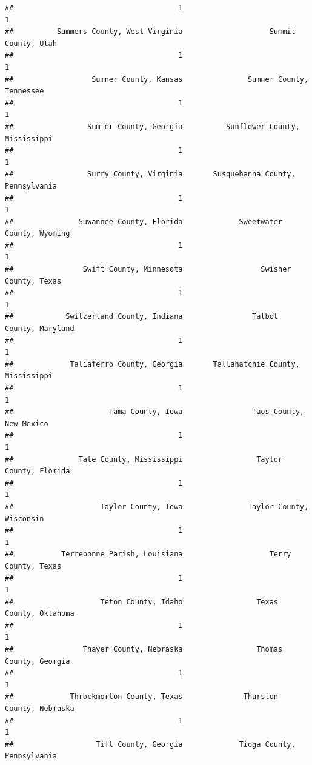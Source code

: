 \documentclass[
]{article}
\begin{document}
\begin{verbatim}
##                                      1                                      1 
##          Summers County, West Virginia                    Summit County, Utah 
##                                      1                                      1 
##                  Sumner County, Kansas               Sumner County, Tennessee 
##                                      1                                      1 
##                 Sumter County, Georgia          Sunflower County, Mississippi 
##                                      1                                      1 
##                 Surry County, Virginia       Susquehanna County, Pennsylvania 
##                                      1                                      1 
##               Suwannee County, Florida             Sweetwater County, Wyoming 
##                                      1                                      1 
##                Swift County, Minnesota                  Swisher County, Texas 
##                                      1                                      1 
##            Switzerland County, Indiana                Talbot County, Maryland 
##                                      1                                      1 
##             Taliaferro County, Georgia       Tallahatchie County, Mississippi 
##                                      1                                      1 
##                      Tama County, Iowa                Taos County, New Mexico 
##                                      1                                      1 
##               Tate County, Mississippi                 Taylor County, Florida 
##                                      1                                      1 
##                    Taylor County, Iowa               Taylor County, Wisconsin 
##                                      1                                      1 
##           Terrebonne Parish, Louisiana                    Terry County, Texas 
##                                      1                                      1 
##                    Teton County, Idaho                 Texas County, Oklahoma 
##                                      1                                      1 
##                Thayer County, Nebraska                 Thomas County, Georgia 
##                                      1                                      1 
##             Throckmorton County, Texas              Thurston County, Nebraska 
##                                      1                                      1 
##                   Tift County, Georgia             Tioga County, Pennsylvania 

\end{verbatim}
\end{document}
